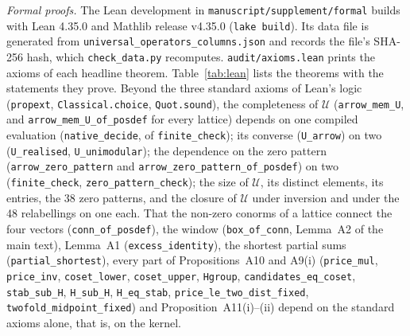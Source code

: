 \documentclass[preprint,pdf]{iucr}          %
\begin{document}
\emph{Formal proofs.} The Lean development in \texttt{manuscript/\allowbreak supplement/\allowbreak formal} builds with Lean 4.35.0 and Mathlib release v4.35.0 (\texttt{lake build}). Its data file is generated from \texttt{universal\_\allowbreak operators\_\allowbreak columns.json} and records the file's SHA-256 hash, which \texttt{check\_data.py} recomputes. \texttt{audit/\allowbreak axioms.lean} prints the axioms of each headline theorem. Table~\ref{tab:lean} lists the theorems with the statements they prove. Beyond the three standard axioms of Lean's logic (\texttt{propext}, \texttt{Classical.\allowbreak choice}, \texttt{Quot.\allowbreak sound}), the completeness of $\mathcal U$ (\texttt{arrow\_\allowbreak mem\_U}, and \texttt{arrow\_\allowbreak mem\_U\_\allowbreak of\_\allowbreak posdef} for every lattice) depends on one compiled evaluation (\texttt{native\_decide}, of \texttt{finite\_\allowbreak check}); its converse (\texttt{U\_arrow}) on two (\texttt{U\_\allowbreak realised}, \texttt{U\_\allowbreak unimodular}); the dependence on the zero pattern (\texttt{arrow\_\allowbreak zero\_\allowbreak pattern} and \texttt{arrow\_\allowbreak zero\_\allowbreak pattern\_\allowbreak of\_\allowbreak posdef}) on two (\texttt{finite\_\allowbreak check}, \texttt{zero\_\allowbreak pattern\_\allowbreak check}); the size of $\mathcal U$, its distinct elements, its entries, the 38 zero patterns, and the closure of $\mathcal U$ under inversion and under the 48 relabellings on one each. That the non-zero conorms of a lattice connect the four vectors (\texttt{conn\_\allowbreak of\_\allowbreak posdef}), the window (\texttt{box\_\allowbreak of\_\allowbreak conn}, Lemma~A2 of the main text), Lemma~A1 (\texttt{excess\_\allowbreak identity}), the shortest partial sums (\texttt{partial\_\allowbreak shortest}), every part of Propositions~A10 and A9(i) (\texttt{price\_mul}, \texttt{price\_inv}, \texttt{coset\_\allowbreak lower}, \texttt{coset\_\allowbreak upper}, \texttt{Hgroup}, \texttt{candidates\_\allowbreak eq\_\allowbreak coset}, \texttt{stab\_\allowbreak sub\_H}, \texttt{H\_sub\_H}, \texttt{H\_\allowbreak eq\_\allowbreak stab}, \texttt{price\_\allowbreak le\_\allowbreak two\_\allowbreak dist\_\allowbreak fixed}, \texttt{twofold\_\allowbreak midpoint\_\allowbreak fixed}) and Proposition~A11(i)--(ii) depend on the standard axioms alone, that is, on the kernel.
\end{document}
